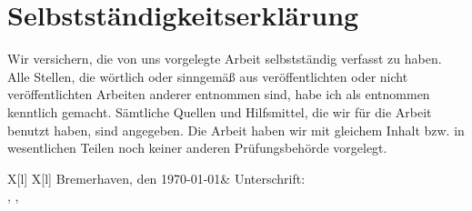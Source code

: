 \section*{Selbstständigkeitserklärung}

Wir versichern, die von uns vorgelegte Arbeit selbstständig verfasst zu haben. Alle Stellen, die wörtlich oder sinngemäß aus veröffentlichten oder nicht veröffentlichten Arbeiten anderer entnommen sind, 
habe ich als entnommen kenntlich gemacht. Sämtliche Quellen und Hilfsmittel, die wir für die Arbeit benutzt haben, sind angegeben. Die Arbeit haben wir mit gleichem Inhalt bzw. in wesentlichen 
Teilen noch keiner anderen Prüfungsbehörde vorgelegt.

\vspace*{1cm}

\begin{tblr}{X[l] X[l]}
Bremerhaven, den \today & Unterschrift:\\ ,
, 
\end{tblr}
